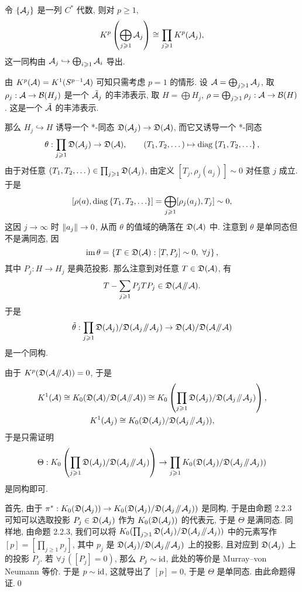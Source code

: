 \begin{Proposition}
	令 $ \left\{ \mathcal{A}_j \right\} $ 是一列 $ C^* $ 代数, 则对 $ p\geqslant 1 $,
	\[
		K^p\left(\bigoplus_{j\geqslant 1}\mathcal{A}_j\right)\cong\prod_{j\geqslant 1}K^p(\mathcal{A}_j),
	\]
	这一同构由 $ \mathcal{A}_j\hookrightarrow\bigoplus_{i\geqslant 1}\mathcal{A}_i $ 导出.
\end{Proposition}
\begin{Proof}
	由 $ K^p(\mathcal{A})=K^1(S^{p-1}\mathcal{A}) $ 可知只需考虑 $ p=1 $ 的情形. 设 $ \mathcal{A}=\bigoplus_{j\geqslant 1}\mathcal{A}_j $, 取 $ \rho_j : \mathcal{A}\to\mathcal{B}(H_j) $ 是一个 $ \tilde{\mathcal{A}}_j $ 的丰沛表示, 取 $ H=\bigoplus H_j $, $ \rho=\bigoplus_{j\geqslant 1}\rho_j : \mathcal{A}\to\mathcal{B}(H) $. 这是一个 $ \tilde{\mathcal{A}} $ 的丰沛表示.

	那么 $ H_j\hookrightarrow H $ 诱导一个 *-同态 $ \mathfrak{D}(\mathcal{A}_j)\to\mathfrak{D}(\mathcal{A}) $, 而它又诱导一个 *-同态
	\[
		\theta : \prod_{j\geqslant 1}\FD(\CA_j)\to\FD(\CA),\qquad (T_1,T_2,\dots)\mapsto\diag\set{T_1,T_2,\dots},
	\]
	由于对任意 $ (T_1,T_2,\dots)\in\prod_{j\geqslant 1}\mathfrak{D}(\mathcal{A}_j) $, 由定义 $ [T_j,\rho_j(a_j)]\sim 0 $ 对任意 $ j $ 成立. 于是
	\[
		[\rho(a),\diag\set{T_1,T_2,\dots}]=\bigoplus_{j\geqslant 1}[\rho_j(a_j),T_j]\sim 0,
	\]
	这因 $ j\to\infty $ 时 $ \left\| a_j \right\|\to 0 $, 从而 $ \theta $ 的值域的确落在 $ \mathfrak{D}(\mathcal{A}) $ 中. 注意到 $ \theta $ 是单同态但不是满同态, 因
	\[
		\im\theta=\set{T\in\FD(\CA) : [T,P_j]\sim 0,\ \forall j},
	\]
	其中 $ P_j : H\to H_j $ 是典范投影. 那么注意到对任意 $ T\in\mathfrak{D}(\mathcal{A}) $, 有
	\[
		T-\sum_{j\geqslant 1}P_jTP_j\in\mathfrak{D}(\mathcal{A}\mathbin{\!/\mkern-5mu/\!}\mathcal{A}).
	\]
	于是
	\[
		\tilde{\theta} : \prod_{j\geqslant 1}\mathfrak{D}(\mathcal{A}_j)/\mathfrak{D}(\mathcal{A}_j\mathbin{\!/\mkern-5mu/\!}\mathcal{A}_j)\to\mathfrak{D}(\mathcal{A})/\mathfrak{D}(\mathcal{A}\mathbin{\!/\mkern-5mu/\!}\mathcal{A})
	\]
	是一个同构.

	由于 $ K^p(\mathfrak{D}(\mathcal{A}\mathbin{\!/\mkern-5mu/\!}\mathcal{A}))=0 $, 于是
	\begin{gather*}
			K^1(\CA)\cong K_0(\FD(\CA)/\FD(\CA\slantpar\CA))\cong K_0\left(\prod_{j\geqslant 1}\FD(\CA_j)/\FD(\CA_j\slantpar\CA_j)\right),\\
			K^1(\CA_j)\cong K_0(\FD(\CA_j)/\FD(\CA_j\slantpar\CA_j)),
	\end{gather*}
	于是只需证明
	\[
		\Theta : K_0\left(\prod_{j\geqslant 1}\mathfrak{D}(\mathcal{A}_j)/\mathfrak{D}(\mathcal{A}_j\mathbin{\!/\mkern-5mu/\!}\mathcal{A}_j)\right)\to\prod_{j\geqslant 1}K_0(\mathfrak{D}(\mathcal{A}_j)/\mathfrak{D}(\mathcal{A}_j\mathbin{\!/\mkern-5mu/\!}\mathcal{A}_j))
	\]
	是同构即可.

	首先, 由于 $ \pi^* : K_0(\mathfrak{D}(\mathcal{A}_j))\to K_0(\mathfrak{D}(\mathcal{A}_j)/\mathfrak{D}(\mathcal{A}_j\mathbin{\!/\mkern-5mu/\!}\mathcal{A}_j)) $ 是同构, 于是由命题 2.2.3 可知可以选取投影 $ P_j\in\mathfrak{D}(\mathcal{A}_j) $ 作为 $ K_0(\mathfrak{D}(\mathcal{A}_j)) $ 的代表元, 于是 $ \Theta $ 是满同态. 同样地, 由命题 2.2.3, 我们可以将 $ K_0(\prod_{j\geqslant 1}\mathfrak{D}(\mathcal{A}_j)/\mathfrak{D}(\mathcal{A}_j\mathbin{\!/\mkern-5mu/\!}\mathcal{A}_j)) $ 中的元素写作 $ [p]=\left[\prod_{j\geqslant 1}p_j\right] $, 其中 $ p_j $ 是 $ \mathfrak{D}(\mathcal{A}_j)/\mathfrak{D}(\mathcal{A}_j\mathbin{\!/\mkern-5mu/\!}\mathcal{A}_j) $ 上的投影, 且对应到 $ \mathfrak{D}(\mathcal{A}_j) $ 上的投影 $ P_j $. 若 $ \forall j\,([P_j]=0) $, 那么 $ P_j\sim\mathrm{id} $, 此处的等价是 Murray--von Neumann 等价. 于是 $ p\sim\mathrm{id} $, 这就导出了 $ [p]=0 $, 于是 $ \Theta $ 是单同态. 由此命题得证.\qed
\end{Proof}

